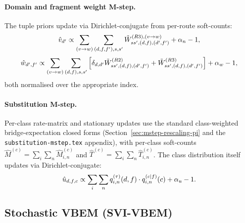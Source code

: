 \paragraph{Domain and fragment weight M-step.}
The tuple priors update via Dirichlet-conjugate from per-route
soft-counts:
\begin{equation}
\label{eq:vbem-domw-mstep}
\hat{v}_{d'} \propto
   \sum_{(v\to w)} \sum_{(d, f, f'), s, s'}
      \tilde W^{(R3), (v\to w)}_{ss', (d,f),(d',f')} + \alpha_n - 1,
\end{equation}
\begin{equation}
\label{eq:vbem-fragw-mstep}
\hat{w}_{d', f'} \propto
   \sum_{(v\to w)} \sum_{(d, f), s, s'}\Big[
      \delta_{d, d'} \tilde W^{(R2)}_{ss', (d,f),(d',f')}
      + \tilde W^{(R3)}_{ss', (d,f),(d',f')}
   \Big] + \alpha_w - 1,
\end{equation}
both normalised over the appropriate index.

\paragraph{Substitution M-step.}
Per-class rate-matrix and stationary updates use the standard
class-weighted bridge-expectation closed forms
(Section~\ref{sec:mstep-rescaling-pi} and the
\texttt{substitution-mstep.tex} appendix), with per-class soft-counts
$\hat M^{(c)} = \sum_i \sum_n \hat M^{(c)}_{i, n}$ and $\hat T^{(c)} =
\sum_i \sum_n \hat T^{(c)}_{i, n}$. The class distribution itself
updates via Dirichlet-conjugate:
\begin{equation}
\label{eq:vbem-classdist-mstep}
\hat{u}_{d, f, c} \propto
   \sum_i \sum_n q^{(\tau)}_{i, n}(d, f) \cdot q^{(c|f)}_{i, n}(c)
   + \alpha_u - 1.
\end{equation}

\subsection{Stochastic VBEM (SVI-VBEM)}
\label{sec:vbem-svi}

